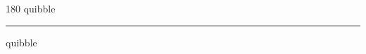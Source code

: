 
\begin{frame}
\begin{center}
\begin{turn}{180}
{\fontsize{2.5cm}{1em}\selectfont quibble}
\end{turn}
\vspace{1em}\par  
\hrule
\vspace{1em}\par  
{\fontsize{2.5cm}{1em}\selectfont quibble}
\end{center}
\end{frame}
